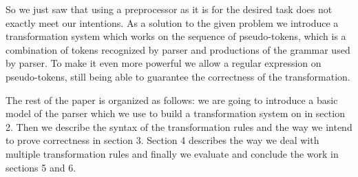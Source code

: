 
So we just saw that using a preprocessor as it is for the desired task 
does not exactly meet our intentions.
As a solution to the given problem we introduce a transformation system
which works on the sequence of pseudo-tokens, which is a combination
of tokens recognized by parser and productions of the grammar
used by parser.  To make it even more powerful we allow a 
regular expression on pseudo-tokens, still being able to 
guarantee the correctness of the transformation.

The rest of the paper is organized as follows: we are going to 
introduce a basic model of the parser which we use to build a
transformation system on in section 2.  Then we describe the syntax of
the transformation rules and the way we intend to prove correctness
in section 3.  Section 4 describes the way we deal with multiple 
transformation rules and finally we evaluate and conclude 
the work in sections 5 and 6.

